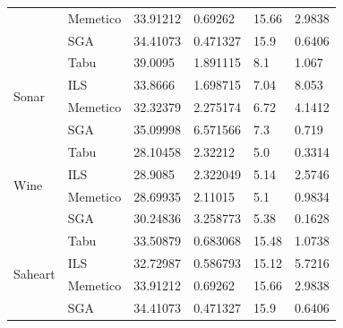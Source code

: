 \documentclass[11pt]{article}
\begin{document}
\begin{table}[h]
{\begin{tabular}{ |l|l|l|l|l|l| }
                              & Memetico & 33.91212   & 0.69262      &  15.66  & 2.9838 \\
                              & SGA      & 34.41073   & 0.471327     &  15.9   & 0.6406\\ \hline
    \multirow{4}{*}{Sonar}  & Tabu     & 39.0095    & 1.891115     &  8.1    & 1.067 \\
                            & ILS      & 33.8666    & 1.698715     &  7.04   & 8.053 \\
                            & Memetico & 32.32379   & 2.275174     &  6.72   & 4.1412 \\
                            & SGA      & 35.09998   & 6.571566     &  7.3    & 0.719\\ \hline
    \multirow{4}{*}{Wine} & Tabu     & 28.10458   &  2.32212     &  5.0      & 0.3314 \\
                          & ILS      & 28.9085    &  2.322049    &  5.14   & 2.5746 \\
                          & Memetico & 28.69935   &  2.11015     &  5.1    & 0.9834 \\
                          & SGA      & 30.24836   &  3.258773    &  5.38   & 0.1628\\ \hline
    \multirow{4}{*}{Saheart}  & Tabu     & 33.50879   & 0.683068     &  15.48  & 1.0738 \\
                              & ILS      & 32.72987   & 0.586793     &  15.12  & 5.7216 \\
                              & Memetico & 33.91212   & 0.69262      &  15.66  & 2.9838 \\
                              & SGA      & 34.41073   & 0.471327     &  15.9   & 0.6406\\ \hline
\end{tabular}
}
\end{table}

\newpage
\end{document}
